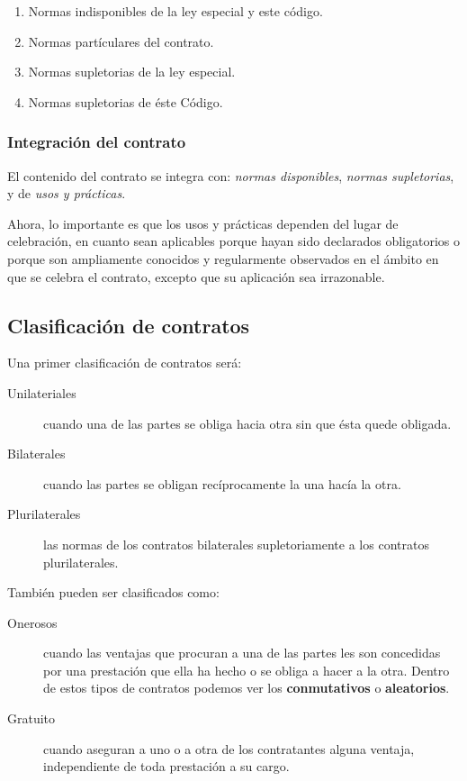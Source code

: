\documentclass[../resumen.tex]{subfiles}
\begin{document}
\begin{enumerate}
  \item Normas indisponibles de la ley especial y este código.
  \item Normas partículares del contrato.
  \item Normas supletorias de la ley especial.
  \item Normas supletorias de éste Código.
\end{enumerate}

\subsubsection{Integración del contrato}

El contenido del contrato se integra con: \textit{normas disponibles}, \textit{normas supletorias},
y de \textit{usos y prácticas}.

Ahora, lo importante es que los usos y prácticas dependen del lugar de celebración,
en cuanto sean aplicables porque hayan sido declarados obligatorios o porque
son ampliamente conocidos y regularmente observados en el ámbito en que se celebra
el contrato, excepto que su aplicación sea irrazonable.


\subsection{Clasificación de contratos}

Una primer clasificación de contratos será:

\begin{description}
  \item[Unilateriales] cuando una de las partes se obliga hacia otra sin que ésta
    quede obligada.
  \item[Bilaterales] cuando las partes se obligan recíprocamente la una hacía la
    otra.
  \item[Plurilaterales] las normas de los contratos bilaterales supletoriamente
    a los contratos plurilaterales.
\end{description}

También pueden ser clasificados como:

\begin{description}
  \item[Onerosos] cuando las ventajas que procuran a una de las partes les son
    concedidas por una prestación que ella ha hecho o se obliga a hacer a la otra. 
    Dentro de estos tipos de contratos podemos ver los \textbf{conmutativos} o
    \textbf{aleatorios}.
  \item[Gratuito] cuando aseguran a uno o a otra de los contratantes alguna
    ventaja, independiente de toda prestación a su cargo.
\end{description}
\end{document}
